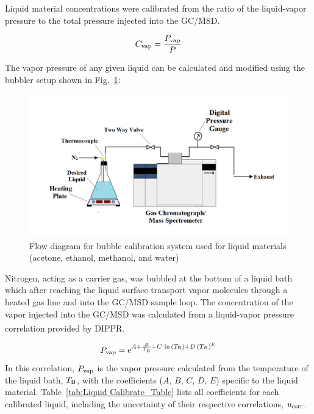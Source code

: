 \documentclass[12pt]{article}
\begin{document}
Liquid material concentrations were calibrated from the ratio of the liquid-vapor pressure to the total pressure injected into the GC/MSD.

\begin{equation}
\label{eq:liquid_vapor_concentration}
C_{\rm vap} =\frac {P_{\rm vap}}{P}
\end{equation}

The vapor pressure of any given liquid can be calculated and modified using the bubbler setup shown in Fig.~\ref{fig:Bubbler}:

\begin{figure}[h!]
	\centering
\includegraphics[width=\textwidth,keepaspectratio]{Bubbler_Setup.png}
	\caption[Flow diagram for bubble calibration system used for liquid materials]{Flow diagram for bubble calibration system used for liquid materials (acetone, ethanol, methanol, and water)}
	\label{fig:Bubbler}
\end{figure}
Nitrogen, acting as a carrier gas, was bubbled at the bottom of a liquid bath which after reaching the liquid surface transport vapor molecules through a heated gas line and into the GC/MSD sample loop. The concentration of the vapor injected into the GC/MSD was calculated from a liquid-vapor pressure correlation provided by DIPPR\textsuperscript{\textregistered}.

\begin{equation}
\label{eq:liquid_vapor_pressure_correlation}
P_{\rm vap} ={\rm e}^{A+\frac{B}{T_{\rm B}}+C\,\ln{(T_{\rm B})}+D\,(T_{B})^{E}}
\end{equation}
In this correlation, $P_{\rm vap}$ is the vapor pressure calculated from the temperature of the liquid bath, $T_{\rm B}$, with the coefficients ($A$, $B$, $C$, $D$, $E$) specific to the liquid material. Table~\ref{tab:Liquid Calibrate_Table} lists all coefficients for each calibrated liquid, including the uncertainty of their respective correlations, $u_{\rm corr}$.
\end{document}
